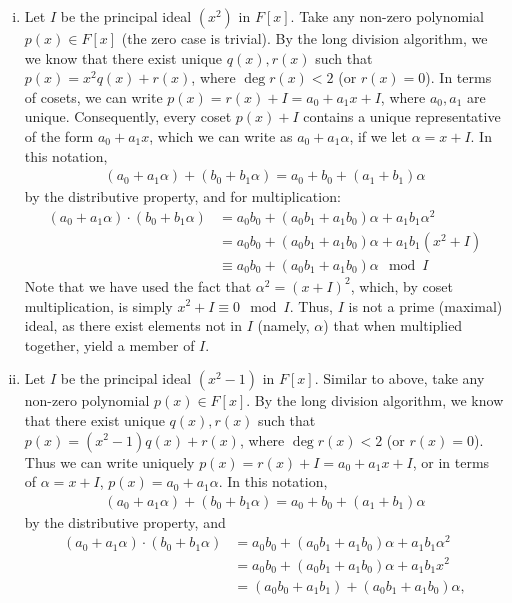 \documentclass{../../mathnotes}
\begin{document}
\begin{enumerate}[(i)]
    \item Let $I$ be the principal ideal $(x^2)$ in $F[x]$. Take any non-zero polynomial $p(x)\in F[x]$ (the zero case is trivial). By the long division algorithm, we 
        we know that there exist unique $q(x), r(x)$ such that $p(x)=x^2q(x)+r(x)$, where $\deg r(x)<2$ (or $r(x)=0$). In terms of cosets,
        we can write $p(x)=r(x)+I=a_0+a_1x+I$, where $a_0,a_1$ are unique. Consequently, every coset $p(x)+I$ contains a unique
        representative of the form $a_0+a_1x$, which we can write as $a_0+a_1\alpha$, if we let $\alpha=x+I$. In this notation,
        \begin{align*}
            (a_0+a_1\alpha)+(b_0+b_1\alpha)=a_0+b_0+(a_1+b_1)\alpha
        \end{align*}
        by the distributive property, and for multiplication:
        \begin{align*}
            (a_0+a_1\alpha)\cdot(b_0+b_1\alpha)&=a_0b_0+(a_0b_1+a_1b_0)\alpha+a_1b_1\alpha^2\\
            &=a_0b_0+(a_0b_1+a_1b_0)\alpha+a_1b_1(x^2 + I)\\
            &\equiv a_0b_0+(a_0b_1+a_1b_0)\alpha\mod I
        \end{align*}
        Note that we have used the fact that $\alpha^2=(x+I)^2$, which, by coset multiplication, is simply $x^2+I\equiv 0\mod I$.
        Thus, $I$ is not a prime (maximal) ideal, as there exist elements not in $I$ (namely, $\alpha$) that
        when multiplied together, yield a member of $I$.
    \item Let $I$ be the principal ideal $(x^2-1)$ in $F[x]$. Similar to above, take any non-zero polynomial $p(x)\in F[x]$. By the
        long division algorithm, we know that there exist unique $q(x),r(x)$ such that $p(x)=(x^2-1)q(x)+r(x)$, where $\deg r(x)<2$ (or $r(x)=0$).
        Thus we can write uniquely $p(x)=r(x)+I=a_0+a_1x+I$, or in terms of $\alpha=x+I$, $p(x)=a_0+a_1\alpha$. In this notation,
        \begin{align*}
            (a_0+a_1\alpha)+(b_0+b_1\alpha)=a_0+b_0+(a_1+b_1)\alpha
        \end{align*}
        by the distributive property, and
        \begin{align*}
            (a_0+a_1\alpha)\cdot(b_0+b_1\alpha)&=a_0b_0+(a_0b_1+a_1b_0)\alpha+a_1b_1\alpha^2\\
            &=a_0b_0+(a_0b_1+a_1b_0)\alpha+a_1b_1x^2\\
            &=(a_0b_0+a_1b_1)+(a_0b_1+a_1b_0)\alpha,
        \end{align*}

\end{enumerate}
\end{document}
